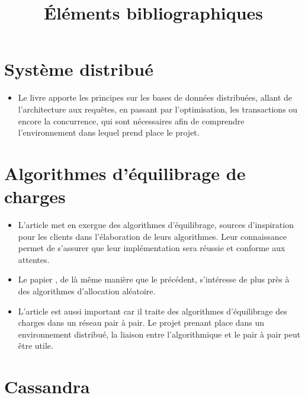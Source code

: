 \documentclass[12 pt]{article}
\title{Éléments bibliographiques}
\begin{document}
\maketitle
\section{Système distribué}

\begin{itemize}
\item Le livre \cite{Ozsu2011} apporte les principes sur les bases de données distribuées, allant de l'architecture aux requêtes, en passant par l'optimisation, les transactions ou encore la concurrence, qui sont nécessaires afin de comprendre l'environnement dans lequel prend place le projet.
\end{itemize}

\section{Algorithmes d'équilibrage de charges}

\begin{itemize}
\item L'article \cite{BalancedAlloc99} met en exergue des algorithmes d'équilibrage, sources d'inspiration pour les clients dans l'élaboration de leurs algorithmes. Leur connaissance permet de s'assurer que leur implémentation sera réussie et conforme aux attentes.

\item Le papier \cite{RandomChoices05}, de là même manière que le précédent, s'intéresse de plus près à des algorithmes d'allocation aléatoire.

\item L'article \cite{LoadBalancingPeertoPeer14} est aussi important car il traite des algorithmes d'équilibrage des charges dans un réseau pair à pair. Le projet prenant place dans un environnement distribué, la liaison entre l'algorithmique et le pair à pair peut être utile. 
\end{itemize}

\section{Cassandra}
\end{document}
